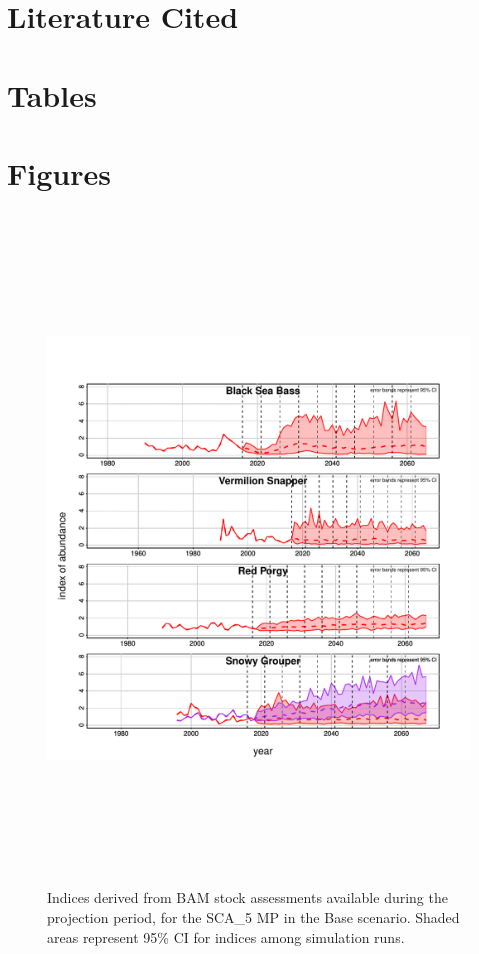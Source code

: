 \documentclass[12pt,english]{article}
\begin{document}
\clearpage
\section*{Literature Cited}
\renewcommand{\refname}{}
\vspace{-1cm}




\newpage
\section*{Tables}

%


\newpage
\section*{Figures}

\begin{figure}[!ht]
\begin{center}
\includegraphics[width=6in,height=7in]{../Figs/AddInd.pdf}
\end{center}
\begin{flushleft}
\caption{Indices derived from BAM stock assessments available during the projection period, for the SCA\_5 MP in the Base scenario. Shaded areas represent 95\% CI for indices among simulation runs.}
\label{fig:phasePlot1}
\end{flushleft}
\end{figure}
\end{document}
